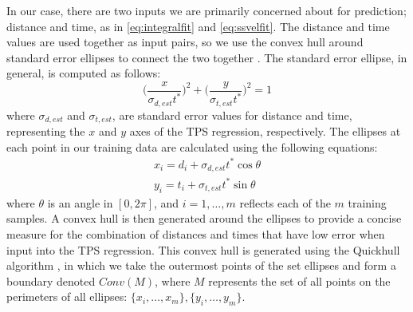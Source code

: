 \documentclass[letterpaper, 10 pt, conference]{ieeeconf}  %
\newcommand\NB[1]{$\spadesuit$\footnote{NB: #1}}
\begin{document}
In our case, there are two inputs we are primarily concerned about for prediction; distance and time, as in \eqref{eq:integralfit} and \eqref{eq:ssvelfit}. The distance and time values are used together as input pairs, so we use the convex hull around standard error ellipses to connect the two together \cite{stdellipse}. The standard error ellipse, in general, is computed as follows: %
\begin{equation}
    \bigg(\frac{x}{\sigma_{d,est}t^*}\bigg)^2 + \bigg(\frac{y}{\sigma_{t,est}t^*}\bigg)^2 = 1
\end{equation}
where $\sigma_{d,est}$ and $\sigma_{t,est}$, are standard error values for distance and time, representing the $x$ and $y$ axes of the TPS regression, respectively. The ellipses at each point in our training data are calculated using the following equations:
\begin{align} \label{eq:bounds}
    x_i = d_i + \sigma_{d,est}t^*\cos{\theta} \nonumber \\
    y_i = t_i + \sigma_{t,est}t^*\sin{\theta} 
\end{align}
where $\theta$ is an angle in $[0,2\pi]$, and $i = 1,\ldots,m$ reflects each of the $m$ training samples. A convex hull is then generated around the ellipses to provide a concise measure for the combination of distances and times that have low error when input into the TPS regression. This convex hull is generated using the Quickhull algorithm \cite{quickhull}, in which we take the outermost points of the set ellipses and form a boundary denoted $Conv(M)$, where $M$ represents the set of all points on the perimeters of all ellipses: $\{x_i,\ldots,x_m\},\{y_i,\ldots,y_m\}$.
\end{document}
